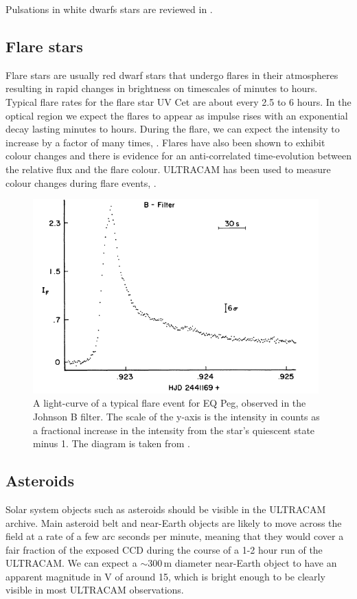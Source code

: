 Pulsations in white dwarfs stars are reviewed in \citet{wingetreview}.

\subsection{Flare stars}
Flare stars are usually red dwarf stars that undergo flares in their atmospheres resulting in rapid changes in brightness on timescales of minutes to hours. Typical flare rates for the flare star {UV Cet} are about every 2.5 to 6 hours. In the optical region we expect the flares to appear as impulse rises with an exponential decay lasting minutes to hours. During the flare, we can expect the intensity to increase by a factor of many times, \citep{typicalflares}. Flares have also been shown to exhibit colour changes and there is evidence for an anti-correlated time-evolution between the relative flux and the flare colour. ULTRACAM has been used to measure colour changes during flare events, \citep{ULTRACAMFlare}.


\begin{figure}
\centering
\includegraphics[width=110mm]{images/EQ_Peg_typical_flare.png}
\caption{A light-curve of a typical flare event for EQ Peg, observed in the Johnson B filter. The scale of the y-axis is the intensity in counts as a fractional increase in the intensity from the star's quiescent state minus 1. The diagram is taken from \citet{typicalflares}. }
\label{fig:wumadiagram}
\end{figure}

\subsection{Asteroids}
Solar system objects such as asteroids should be visible in the ULTRACAM archive. Main asteroid belt and near-Earth objects are likely to move across the field at a rate of a few arc seconds per minute, meaning that they would cover a fair fraction of the exposed CCD during the course of a 1-2 hour run of the ULTRACAM. We can expect a $\sim 300\,\mbox{m}$ diameter near-Earth object to have an apparent magnitude in V of around 15, \citep{neosmalltelescope} which is bright enough to be clearly visible in most ULTRACAM observations. 

